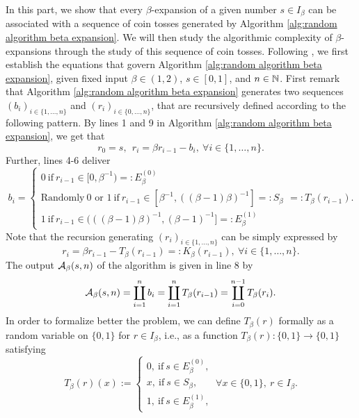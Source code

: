 In this part, we show that every $\beta$-expansion of a given number $s \in I_\beta$ can be associated with a sequence of coin tosses generated by Algorithm \ref{alg:random algorithm beta expansion}. We will then study the algorithmic complexity of $\beta$-expansions through the study of this sequence of coin tosses. Following \cite[Section 1.2]{dajani2003random}, we first establish the equations that govern Algorithm \ref{alg:random algorithm beta expansion}, given fixed input $\beta \in (1,2)$, $s \in [0,1]$, and $n \in \mathbb{N}$. First remark that Algorithm \ref{alg:random algorithm beta expansion} generates two sequences $(b_i)_{i \in \{1,\ldots,n\}}$ and $(r_i)_{i \in \{0,\ldots,n\}}$, that are recursively defined according to the following pattern. By lines 1 and 9 in Algorithm \ref{alg:random algorithm beta expansion}, we get that 
\begin{equation}
    r_0 = s, \ \ r_i = \beta r_{i-1} - b_i, \ \forall i \in \{1, \ldots, n\}.
\end{equation}
Further, lines 4-6 deliver
\begin{equation}
    b_i = \begin{cases}
        0 \ \text{if} \ r_{i-1} \in [0, \beta^{-1}) =: E_\beta^{(0)}\\
        \text{Randomly} \ 0 \text{ or } 1 \ \text{if} \  r_{i-1}  \in [\beta^{-1}, ((\beta-1)\beta)^{-1}] =: S_\beta\\
        1 \ \text{if} \ r_{i-1} \in (((\beta-1)\beta)^{-1}, (\beta-1)^{-1}] =: E_\beta^{(1)}
    \end{cases} =: T_\beta(r_{i-1}).
\end{equation}
Note that the recursion generating $(r_i)_{i \in \{1, \ldots , n\}}$ can be simply expressed by 
\begin{equation}\label{eq:definition of K beta, simple recursive relation for r i}
    r_i = \beta r_{i-1} - T_\beta(r_{i-1}) =: K_\beta(r_{i-1}), \ \forall i \in \{1, \ldots, n\}.
\end{equation}
The output $\mathcal{A}_\beta (s,n)$ of the algorithm is given in line 8 by 
\begin{equation}
    \mathcal{A}_\beta (s,n) = \coprod_{i=1}^n b_i = \coprod_{i=1}^n T_\beta(r_{i-1}) =  \coprod_{i=0}^{n-1} T_\beta(r_i).
\end{equation}
In order to formalize better the problem, we can define $T_\beta(r)$ formally as a random variable on $\{0,1\}$ for $r \in I_\beta$, i.e., as a function $T_\beta(r) : \{0,1\} \to \{0,1\}$ satisfying
\begin{equation}
    T_\beta(r)(x) := \begin{cases}
        0, \ \text{if} \ s \in  E_\beta^{(0)},\\
        x, \ \text{if} \ s \in  S_\beta,\\
        1, \ \text{if} \ s \in  E_\beta^{(1)},
    \end{cases}
    \ \forall x \in \{0,1\}, \ r \in I_\beta.
\end{equation}
